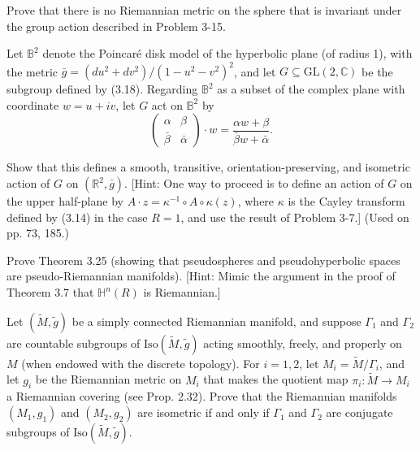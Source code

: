 \begin{exercise}\label{prob:no-riemannian-metric-invariant-lorentz}
Prove that there is no Riemannian metric on the sphere that is invariant under the group action described in Problem 3-15.
\end{exercise}

\begin{exercise}\label{prob:poincare-disk}
Let $\mathbb{B}^2$ denote the Poincaré disk model of the hyperbolic plane (of radius 1), with the metric $\bar{g} = (du^2 + dv^2)/(1-u^2-v^2)^2$, and let $G \subseteq \text{GL}(2,\mathbb{C})$ be the subgroup defined by (3.18). Regarding $\mathbb{B}^2$ as a subset of the complex plane with coordinate $w = u + iv$, let $G$ act on $\mathbb{B}^2$ by
\[
\begin{pmatrix} \alpha & \beta \\ \bar{\beta} & \bar{\alpha} \end{pmatrix} \cdot w = \frac{\alpha w + \beta}{\bar{\beta}w + \bar{\alpha}}.
\]

Show that this defines a smooth, transitive, orientation-preserving, and isometric action of $G$ on $(\mathbb{R}^2, \bar{g})$. [Hint: One way to proceed is to define an action of $G$ on the upper half-plane by $A \cdot z = \kappa^{-1} \circ A \circ \kappa(z)$, where $\kappa$ is the Cayley transform defined by (3.14) in the case $R = 1$, and use the result of Problem 3-7.] (Used on pp. 73, 185.)
\end{exercise}

\begin{exercise}\label{prob:pseudospheres-pseudo-riemannian}
Prove Theorem 3.25 (showing that pseudospheres and pseudohyperbolic spaces are pseudo-Riemannian manifolds). [Hint: Mimic the argument in the proof of Theorem 3.7 that $\mathbb{H}^n(R)$ is Riemannian.]
\end{exercise}

\begin{exercise}\label{prob:riemannian-quotients-conjugate-subgroups}
Let $(\tilde{M},\tilde{g})$ be a simply connected Riemannian manifold, and suppose $\Gamma_1$ and $\Gamma_2$ are countable subgroups of $\mathrm{Iso}(\tilde{M},\tilde{g})$ acting smoothly, freely, and properly on $M$ (when endowed with the discrete topology). For $i = 1,2$, let $M_i = \tilde{M}/\Gamma_i$, and let $g_i$ be the Riemannian metric on $M_i$ that makes the quotient map $\pi_i : \tilde{M} \to M_i$ a Riemannian covering (see Prop. 2.32). Prove that the Riemannian manifolds $(M_1,g_1)$ and $(M_2,g_2)$ are isometric if and only if $\Gamma_1$ and $\Gamma_2$ are conjugate subgroups of $\mathrm{Iso}(\tilde{M},\tilde{g})$.
\end{exercise}

